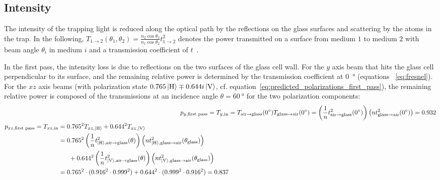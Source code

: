 \subsection*{Intensity}
The intensity of the trapping light is reduced along the optical path by the reflections on the glass surfaces and scattering by the atoms in the trap. In the following, $T_{1 \rightarrow 2}(\theta_1, \theta_2) = \frac{n_2 \cos \theta_2 }{n_1 \cos \theta_2} t_{1\rightarrow 2}^2$ denotes the power transmitted on a surface from medium $1$ to medium $2$ with beam angle $\theta_i$ in medium $i$ and a transmission coefficient of $t$~\cite{demtroder_elektromagnetische_2013}.

In the first pass, the intensity loss is due to reflections on the two surfaces of the glass cell wall. For the $y$ axis beam that hits the glass cell perpendicular to its surface, and the remaining relative power is determined by the transmission coefficient at \SI{0}{\degree} (equations ~\ref{eq:fresnel}). For the $xz$ axis beams (with polarization state $0.765 \Ket{\text{H}} \mp 0.644i \Ket{\text{V}}$, cf. equation~\ref{eq:predicted_polarizations_first_pass}), the remaining relative power is composed of the transmissions at an incidence angle $\theta = \SI{60}{\degree}$ for the two polarization components:
\begin{align}
    p_{y, \text{first pass}} = T_{y, \text{in}} &= T_{\text{air} \rightarrow \text{glass}}(\SI{0}{\degree}) T_{\text{glass} \rightarrow \text{air}}(\SI{0}{\degree}) = \left(\frac{1}{n} t^2_{\text{air} \rightarrow \text{glass}}(\SI{0}{\degree})\right) \left(n t^2_{\text{glass} \rightarrow \text{air}}(\SI{0}{\degree})\right) = \SI{0.932}{}\\
    \begin{split}
        p_{xz, \text{first pass}} = T_{xz, \text{in}} &= 0.765^2 T_{xz, \Ket{\text{H}}} + 0.644^2 T_{xz, \Ket{\text{V}}} \\
        &=  0.765^2 \left(\frac{1}{n} t^2_{\Ket{\text{H}}, \text{air} \rightarrow \text{glass}}(\theta)\right) \left(n t^2_{\Ket{\text{H}}, \text{glass} \rightarrow \text{air}}(\theta_\text{glass})\right) \\ &~~~~~+ 0.644^2 \left(\frac{1}{n} t^2_{\Ket{\text{V}}, \text{air} \rightarrow \text{glass}}(\theta)\right) \left(n t^2_{\Ket{\text{V}}, \text{glass} \rightarrow \text{air}}(\theta_\text{glass})\right) \\
        &= 0.765^2 \cdot (0.916^2 \cdot 0.999^2) + 0.644^2 \cdot (0.999^2 \cdot 0.916^2) = 0.837
    \end{split}
\end{align}

